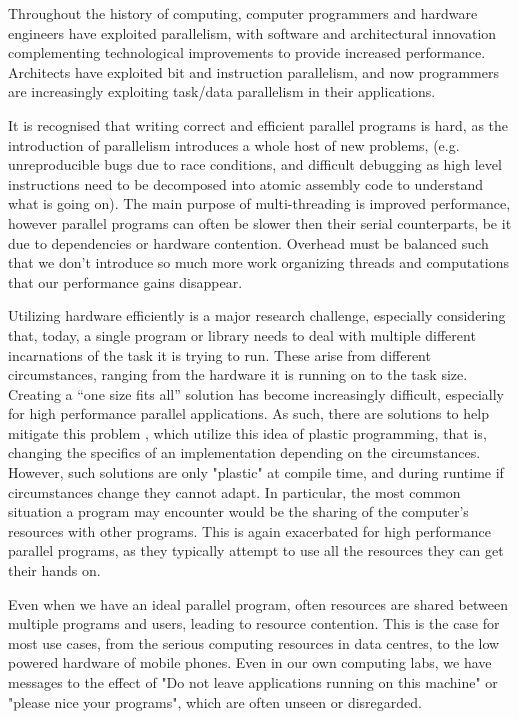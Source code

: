 
Throughout the history of computing, computer programmers and hardware engineers have exploited parallelism, with software and architectural innovation complementing technological improvements to provide increased performance. Architects have exploited bit and instruction parallelism, and now programmers are increasingly exploiting task/data parallelism in their applications.

It is recognised that writing correct and efficient parallel programs is hard, \cite{parallel_challenges} as the introduction of parallelism introduces a whole host of new problems, (e.g. unreproducible bugs due to race conditions, and difficult debugging as high level instructions need to be decomposed  into atomic assembly code to understand what is going on). The main purpose of multi-threading is improved performance, however parallel programs can often be slower then their serial counterparts, be it due to dependencies or hardware contention. Overhead must be balanced such that we don't introduce so much more work organizing threads and computations that our performance gains disappear.

Utilizing hardware efficiently is a major research challenge, especially considering that, today, a single program or library needs to deal with multiple different incarnations of the task it is trying to run. These arise from different circumstances, ranging from the hardware it is running on to the task size. Creating a ``one size fits all'' solution has become increasingly difficult, especially for high performance parallel applications. As such, there are solutions to help mitigate this problem \cite{petabricks}, which utilize this idea of plastic programming, that is, changing the specifics of an implementation depending on the circumstances. However, such solutions are only "plastic" at compile time, and during runtime if circumstances change they cannot adapt. In particular, the most common situation a program may encounter would be the sharing of the computer's resources with other programs. This is again exacerbated for high performance parallel programs, as they typically attempt to use all the resources they can get their hands on.

Even when we have an ideal parallel program, often resources are shared between multiple programs and users, leading to resource contention. This is the case for most use cases, from the serious computing resources in data centres, to the low powered hardware of mobile phones. Even in our own computing labs, we have messages to the effect of "Do not leave applications running on this machine" or "please nice your programs", which are often unseen or disregarded.

